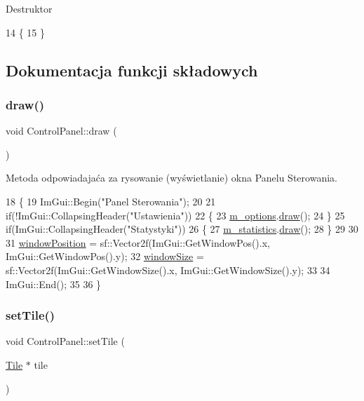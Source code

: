 Destruktor 
\begin{DoxyCode}
14 \{
15 \}
\end{DoxyCode}


\subsection{Dokumentacja funkcji składowych}
\mbox{\label{class_control_panel_a0dc73223e82ee588c1ac61d4f9c3082e}} 
\subsubsection{\texorpdfstring{draw()}{draw()}}
{\footnotesize\ttfamily void Control\+Panel\+::draw (\begin{DoxyParamCaption}{ }\end{DoxyParamCaption})}

Metoda odpowiadajaća za rysowanie (wyświetlanie) okna Panelu Sterowania. 
\begin{DoxyCode}
18 \{
19     ImGui::Begin(\textcolor{stringliteral}{"Panel Sterowania"});
20 
21     \textcolor{keywordflow}{if}(!ImGui::CollapsingHeader(\textcolor{stringliteral}{"Ustawienia"}))
22     \{
23         \mbox{\hyperlink{class_control_panel_a662113a86b5fa2be4790dd5b403e3f70}{m\_options}}.\mbox{\hyperlink{class_options_aba27e24489aab55dc9d1d3c436709a73}{draw}}();
24     \}
25     \textcolor{keywordflow}{if}(ImGui::CollapsingHeader(\textcolor{stringliteral}{"Statystyki"}))
26     \{
27         \mbox{\hyperlink{class_control_panel_a330f6c6c7326c3b76b13e4423108fc88}{m\_statistics}}.\mbox{\hyperlink{class_statistics_a5345e618eb4d5b8448a86d519d5ee33d}{draw}}();
28     \}
29 
30 
31     \mbox{\hyperlink{class_control_panel_afef4fad7217719a2dc9df005a40efda0}{windowPosition}} = sf::Vector2f(ImGui::GetWindowPos().x, ImGui::GetWindowPos().y);
32     \mbox{\hyperlink{class_control_panel_ac270884ed654aa0c068d551b4653e39c}{windowSize}} = sf::Vector2f(ImGui::GetWindowSize().x, ImGui::GetWindowSize().y);
33 
34     ImGui::End();
35 
36 \}
\end{DoxyCode}
\mbox{\label{class_control_panel_a76244d427bb5a852b55c1d0e79e363de}} 
\subsubsection{\texorpdfstring{set\+Tile()}{setTile()}}
{\footnotesize\ttfamily void Control\+Panel\+::set\+Tile (\begin{DoxyParamCaption}\item[{\mbox{\hyperlink{class_tile}{Tile}} $\ast$}]{tile }\end{DoxyParamCaption})}

